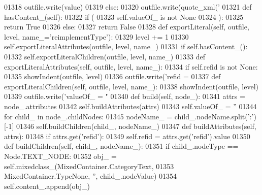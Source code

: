 \begin{DoxyCode}
{{{{{{{{{{{{{{{{{{{{{{{{{{{{{{{{{{{{{{{{{{{{{{{{{{{{{{{{{{{{{{{{{{{{{{{{{{{{01318             outfile.write(value)
01319         \textcolor{keywordflow}{else}:
01320             outfile.write(quote_xml(\textcolor{stringliteral}{'%
01321     \textcolor{keyword}{def }hasContent_(self):
01322         \textcolor{keywordflow}{if} (
01323             self.valueOf_ \textcolor{keywordflow}{is} \textcolor{keywordflow}{not} \textcolor{keywordtype}{None}
01324             ):
01325             \textcolor{keywordflow}{return} \textcolor{keyword}{True}
01326         \textcolor{keywordflow}{else}:
01327             \textcolor{keywordflow}{return} \textcolor{keyword}{False}
01328     \textcolor{keyword}{def }exportLiteral(self, outfile, level, name\_='reimplementType'):
01329         level += 1
01330         self.exportLiteralAttributes(outfile, level, name\_)
01331         \textcolor{keywordflow}{if} self.hasContent_():
01332             self.exportLiteralChildren(outfile, level, name\_)
01333     \textcolor{keyword}{def }exportLiteralAttributes(self, outfile, level, name\_):
01334         \textcolor{keywordflow}{if} self.refid \textcolor{keywordflow}{is} \textcolor{keywordflow}{not} \textcolor{keywordtype}{None}:
01335             showIndent(outfile, level)
01336             outfile.write(\textcolor{stringliteral}{'refid = %
01337     \textcolor{keyword}{def }exportLiteralChildren(self, outfile, level, name\_):
01338         showIndent(outfile, level)
01339         outfile.write(\textcolor{stringliteral}{'valueOf\_ = "%
01340     \textcolor{keyword}{def }build(self, node\_):
01341         attrs = node\_.attributes
01342         self.buildAttributes(attrs)
01343         self.valueOf_ = \textcolor{stringliteral}{''}
01344         \textcolor{keywordflow}{for} child\_ \textcolor{keywordflow}{in} node\_.childNodes:
01345             nodeName\_ = child\_.nodeName.split(\textcolor{stringliteral}{':'})[-1]
01346             self.buildChildren(child\_, nodeName\_)
01347     \textcolor{keyword}{def }buildAttributes(self, attrs):
01348         \textcolor{keywordflow}{if} attrs.get(\textcolor{stringliteral}{'refid'}):
01349             self.refid = attrs.get(\textcolor{stringliteral}{'refid'}).value
01350     \textcolor{keyword}{def }buildChildren(self, child\_, nodeName\_):
01351         \textcolor{keywordflow}{if} child\_.nodeType == Node.TEXT\_NODE:
01352             obj\_ = self.mixedclass_(MixedContainer.CategoryText,
01353                 MixedContainer.TypeNone, \textcolor{stringliteral}{''}, child\_.nodeValue)
01354             self.content\_.append(obj\_)
}}}}}}}}}}}}}}}}}}}}}}}}}}}}}}}}}}}}}}}}}}}}}}}}}}}}}}}}}}}}}}}}}}}}}}}}}}}}}}}
\end{DoxyCode}
